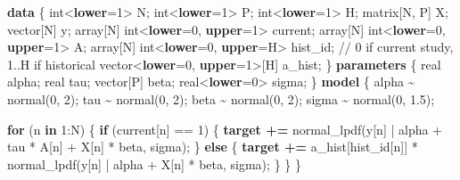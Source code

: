 \documentclass[
  letterpaper,
  DIV=11,
  numbers=noendperiod]{scrartcl}
\newenvironment{Shaded}{\begin{snugshade}}{\end{snugshade}}
\newcommand{\CommentTok}[1]{\textcolor[rgb]{0.37,0.37,0.37}{#1}}
\newcommand{\ControlFlowTok}[1]{\textcolor[rgb]{0.00,0.23,0.31}{\textbf{#1}}}
\newcommand{\DataTypeTok}[1]{\textcolor[rgb]{0.68,0.00,0.00}{#1}}
\newcommand{\DecValTok}[1]{\textcolor[rgb]{0.68,0.00,0.00}{#1}}
\newcommand{\FloatTok}[1]{\textcolor[rgb]{0.68,0.00,0.00}{#1}}
\newcommand{\KeywordTok}[1]{\textcolor[rgb]{0.00,0.23,0.31}{\textbf{#1}}}
\newcommand{\NormalTok}[1]{\textcolor[rgb]{0.00,0.23,0.31}{#1}}
\begin{document}
\begin{Shaded}
\begin{Highlighting}[]
\KeywordTok{data}\NormalTok{ \{}
  \DataTypeTok{int}\NormalTok{\textless{}}\KeywordTok{lower}\NormalTok{=}\DecValTok{1}\NormalTok{\textgreater{} N;}
  \DataTypeTok{int}\NormalTok{\textless{}}\KeywordTok{lower}\NormalTok{=}\DecValTok{1}\NormalTok{\textgreater{} P;}
  \DataTypeTok{int}\NormalTok{\textless{}}\KeywordTok{lower}\NormalTok{=}\DecValTok{1}\NormalTok{\textgreater{} H;}
  \DataTypeTok{matrix}\NormalTok{[N, P] X;}
  \DataTypeTok{vector}\NormalTok{[N] y;}
  \DataTypeTok{array}\NormalTok{[N] }\DataTypeTok{int}\NormalTok{\textless{}}\KeywordTok{lower}\NormalTok{=}\DecValTok{0}\NormalTok{, }\KeywordTok{upper}\NormalTok{=}\DecValTok{1}\NormalTok{\textgreater{} current;}
  \DataTypeTok{array}\NormalTok{[N] }\DataTypeTok{int}\NormalTok{\textless{}}\KeywordTok{lower}\NormalTok{=}\DecValTok{0}\NormalTok{, }\KeywordTok{upper}\NormalTok{=}\DecValTok{1}\NormalTok{\textgreater{} A;}
  \DataTypeTok{array}\NormalTok{[N] }\DataTypeTok{int}\NormalTok{\textless{}}\KeywordTok{lower}\NormalTok{=}\DecValTok{0}\NormalTok{, }\KeywordTok{upper}\NormalTok{=H\textgreater{} hist\_id; }\CommentTok{// 0 if current study, 1..H if historical}
  \DataTypeTok{vector}\NormalTok{\textless{}}\KeywordTok{lower}\NormalTok{=}\DecValTok{0}\NormalTok{, }\KeywordTok{upper}\NormalTok{=}\DecValTok{1}\NormalTok{\textgreater{}[H] a\_hist;}
\NormalTok{\}}
\KeywordTok{parameters}\NormalTok{ \{}
  \DataTypeTok{real}\NormalTok{ alpha;}
  \DataTypeTok{real}\NormalTok{ tau;}
  \DataTypeTok{vector}\NormalTok{[P] beta;}
  \DataTypeTok{real}\NormalTok{\textless{}}\KeywordTok{lower}\NormalTok{=}\DecValTok{0}\NormalTok{\textgreater{} sigma;}
\NormalTok{\}}
\KeywordTok{model}\NormalTok{ \{}
\NormalTok{  alpha \textasciitilde{} normal(}\DecValTok{0}\NormalTok{, }\DecValTok{2}\NormalTok{);}
\NormalTok{  tau   \textasciitilde{} normal(}\DecValTok{0}\NormalTok{, }\DecValTok{2}\NormalTok{);}
\NormalTok{  beta  \textasciitilde{} normal(}\DecValTok{0}\NormalTok{, }\DecValTok{2}\NormalTok{);}
\NormalTok{  sigma \textasciitilde{} normal(}\DecValTok{0}\NormalTok{, }\FloatTok{1.5}\NormalTok{);}

  \ControlFlowTok{for}\NormalTok{ (n }\ControlFlowTok{in} \DecValTok{1}\NormalTok{:N) \{}
    \ControlFlowTok{if}\NormalTok{ (current[n] == }\DecValTok{1}\NormalTok{) \{}
      \KeywordTok{target +=}\NormalTok{ normal\_lpdf(y[n] | alpha + tau * A[n] + X[n] * beta, sigma);}
\NormalTok{    \} }\ControlFlowTok{else}\NormalTok{ \{}
      \KeywordTok{target +=}\NormalTok{ a\_hist[hist\_id[n]] * normal\_lpdf(y[n] | alpha + X[n] * beta, sigma);}
\NormalTok{    \}}
\NormalTok{  \}}
\NormalTok{\}}
\end{Highlighting}
\end{Shaded}
\end{document}
